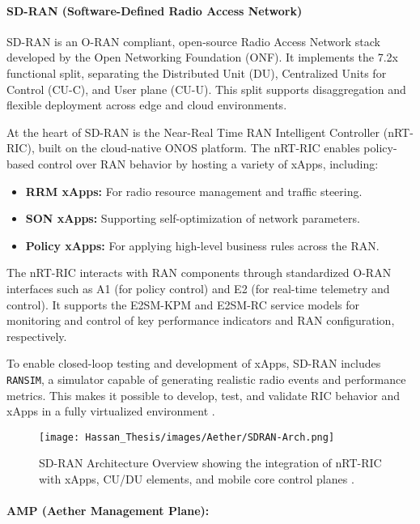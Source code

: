 \paragraph{SD-RAN (Software-Defined Radio Access Network)}

SD-RAN is an O-RAN compliant, open-source Radio Access Network stack developed by the Open Networking Foundation (ONF). It implements the 7.2x functional split, separating the Distributed Unit (DU), Centralized Units for Control (CU-C), and User plane (CU-U). This split supports disaggregation and flexible deployment across edge and cloud environments.

At the heart of SD-RAN is the Near-Real Time RAN Intelligent Controller (nRT-RIC), built on the cloud-native \textmu{}ONOS platform. The nRT-RIC enables policy-based control over RAN behavior by hosting a variety of xApps, including:

\begin{itemize}
    \item \textbf{RRM xApps:} For radio resource management and traffic steering.
    \item \textbf{SON xApps:} Supporting self-optimization of network parameters.
    \item \textbf{Policy xApps:} For applying high-level business rules across the RAN.
\end{itemize}

The nRT-RIC interacts with RAN components through standardized O-RAN interfaces such as A1 (for policy control) and E2 (for real-time telemetry and control). It supports the E2SM-KPM and E2SM-RC service models for monitoring and control of key performance indicators and RAN configuration, respectively.

To enable closed-loop testing and development of xApps, SD-RAN includes \texttt{RANSIM}, a simulator capable of generating realistic radio events and performance metrics. This makes it possible to develop, test, and validate RIC behavior and xApps in a fully virtualized environment \cite{sdran_ransim}.

\begin{figure}[H]
    \centering
    \texttt{[image: Hassan\_Thesis/images/Aether/SDRAN-Arch.png]}
    \caption{SD-RAN Architecture Overview showing the integration of nRT-RIC with xApps, CU/DU elements, and mobile core control planes \cite{sdran_ransim}.}
    \label{fig:sdran-arch}
\end{figure}


\paragraph{AMP (Aether Management Plane):}

